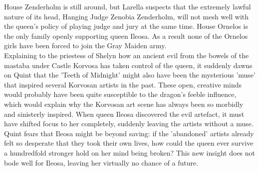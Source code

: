 House Zenderholm is still around, but Larella suspects that the extremely lawful nature of its head, Hanging Judge Zenobia Zenderholm, will not mesh well with the queen's policy of playing judge and jury at the same time. House Ornelos is the only family openly supporting queen Ileosa. As a result none of the Ornelos girls have been forced to join the Gray Maiden army.\\

Explaining to the priestess of Shelyn how an ancient evil from the bowels of the mastaba under Castle Korvosa has taken control of the queen, it suddenly dawns on Quint that the 'Teeth of Midnight' might also have been the mysterious 'muse' that inspired several Korvosan artists in the past. These open, creative minds would probably have been quite susceptible to the dragon's feeble influence, which would explain why the Korvosan art scene has always been so morbidly and sinisterly inspired. When queen Ileosa discovered the evil artefact, it must have shifted focus to her completely, suddenly leaving the artists without a muse. Quint fears that Ileosa might be beyond saving: if the 'abandoned' artists already felt so desperate that they took their own lives, how could the queen ever survive a hundredfold stronger hold on her mind being broken? This new insight does not bode well for Ileosa, leaving her virtually no chance of a future.\\

